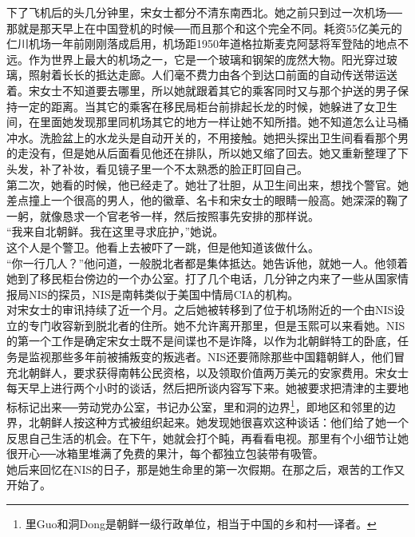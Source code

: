下了飞机后的头几分钟里，宋女士都分不清东南西北。她之前只到过一次机场──那就是那天早上在中国登机的时候──而且那个和这个完全不同。耗资55亿美元的仁川机场一年前刚刚落成启用，机场距1950年道格拉斯麦克阿瑟将军登陆的地点不远。作为世界上最大的机场之一，它是一个玻璃和钢架的庞然大物。阳光穿过玻璃，照射着长长的抵达走廊。人们毫不费力由各个到达口前面的自动传送带运送着。宋女士不知道要去哪里，所以她就跟着其它的乘客同时又与那个护送的男子保持一定的距离。当其它的乘客在移民局柜台前排起长龙的时候，她躲进了女卫生间，在里面她发现那里同机场其它的地方一样让她不知所措。她不知道怎么让马桶冲水。洗脸盆上的水龙头是自动开关的，不用接触。她把头探出卫生间看看那个男的走没有，但是她从后面看见他还在排队，所以她又缩了回去。她又重新整理了下头发，补了补妆，看见镜子里一个不太熟悉的脸正盯回自己。\\

第二次，她看的时候，他已经走了。她壮了壮胆，从卫生间出来，想找个警官。她差点撞上一个很高的男人，他的徽章、名卡和宋女士的眼睛一般高。她深深的鞠了一躬，就像恳求一个官老爷一样，然后按照事先安排的那样说。\\

“我来自北朝鲜。我在这里寻求庇护，”她说。\\

这个人是个警卫。他看上去被吓了一跳，但是他知道该做什么。\\

“你一行几人？”他问道，一般脱北者都是集体抵达。她告诉他，就她一人。他领着她到了移民柜台傍边的一个办公室。打了几个电话，几分钟之内来了一些从国家情报局NIS的探员，NIS是南韩类似于美国中情局CIA的机构。\\

对宋女士的审讯持续了近一个月。之后她被转移到了位于机场附近的一个由NIS设立的专门收容新到脱北者的住所。她不允许离开那里，但是玉熙可以来看她。NIS的第一个工作是确定宋女士既不是间谍也不是诈降，以作为北朝鲜特工的卧底，任务是监视那些多年前被捕叛变的叛逃者。NIS还要筛除那些中国籍朝鲜人，他们冒充北朝鲜人，要求获得南韩公民资格，以及领取价值两万美元的安家费用。宋女士每天早上进行两个小时的谈话，然后把所谈内容写下来。她被要求把清津的主要地标标记出来──劳动党办公室，书记办公室，里和洞的边界\footnote{里Guo和洞Dong是朝鲜一级行政单位，相当于中国的乡和村──译者。}，即地区和邻里的边界，北朝鲜人按这种方式被组织起来。她发现她很喜欢这种谈话：他们给了她一个反思自己生活的机会。在下午，她就会打个盹，再看看电视。那里有个小细节让她很开心──冰箱里堆满了免费的果汁，每个都独立包装带有吸管。\\

她后来回忆在NIS的日子，那是她生命里的第一次假期。在那之后，艰苦的工作又开始了。\\

